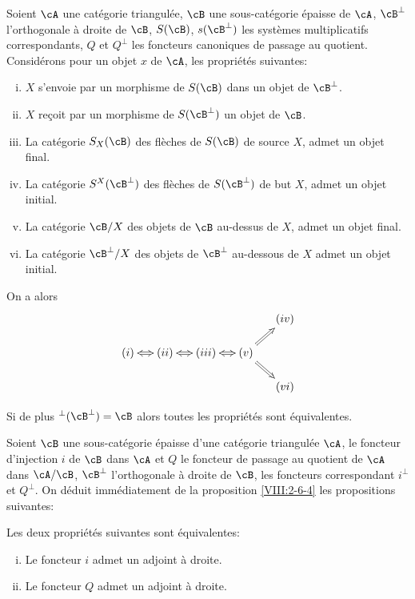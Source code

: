 \begin{proposition}\label{VIII:2-6-4}
Soient $\cA$ une cat\'egorie triangul\'ee, $\cB$ une sous-cat\'egorie 
\'epaisse de $\cA$, $\cB^\bot$ l'orthogonale \`a droite de $\cB$, $S(\cB)$, 
$s(\cB^\bot)$ les syst\`emes multiplicatifs correspondants, $Q$ et $Q^\bot$ les 
foncteurs canoniques de passage au quotient. Consid\'erons pour un objet $x$ de 
$\cA$, les propri\'et\'es suivantes: 
\begin{enumerate}[(i)]
  \item $X$ s'envoie par un morphisme de $S(\cB)$ dans un objet de $\cB^\bot$. 
  \item $X$ reçoit par un morphisme de $S(\cB^\bot)$ un objet de $\cB$. 
  \item La cat\'egorie $S_X(\cB)$ des fl\`eches de $S(\cB)$ de source $X$, 
    admet un objet final. 
  \item La cat\'egorie $S^X(\cB^\bot)$ des fl\`eches de $S(\cB^\bot)$ de but 
    $X$, admet un objet initial. 
  \item La cat\'egorie $\cB/X$ des objets de $\cB$ au-dessus de $X$, admet un 
    objet final. 
  \item La cat\'egorie $\cB^\bot/X$ des objets de $\cB^\bot$ au-dessous de $X$ 
    admet un objet initial. 
\end{enumerate}
On a alors 
\[\xymatrix@=0.5cm{
  & & & & (iv) \\
  (i) \ar@{<=>}[r] 
    & (ii) \ar@{<=>}[r] 
    & (iii) \ar@{<=>}[r] 
    & (v) \ar@{=>}[ur] \ar@{=>}[dr] \\
  & & & & (vi) 
}\]

Si de plus $^\bot(\cB^\bot)=\cB$ alors toutes les propri\'et\'es sont 
\'equivalentes. 
\end{proposition}

Soient $\cB$ une sous-cat\'egorie \'epaisse d'une cat\'egorie triangul\'ee 
$\cA$, le foncteur d'injection $i$ de $\cB$ dans $\cA$ et $Q$ le foncteur de 
passage au quotient de $\cA$ dans $\cA/\cB$, $\cB^\bot$ l'orthogonale \`a 
droite de $\cB$, les foncteurs correspondant $i^\bot$ et $Q^\bot$. On d\'eduit 
imm\'ediatement de la proposition \ref{VIII:2-6-4} les propositions suivantes: 





\begin{proposition}\label{VIII:2-6-5}
Les deux propri\'et\'es suivantes sont \'equivalentes: 
\begin{enumerate}[(i)]
  \item Le foncteur $i$ admet un adjoint \`a droite. 
  \item Le foncteur $Q$ admet un adjoint \`a droite. 
\end{enumerate}
\end{proposition}

